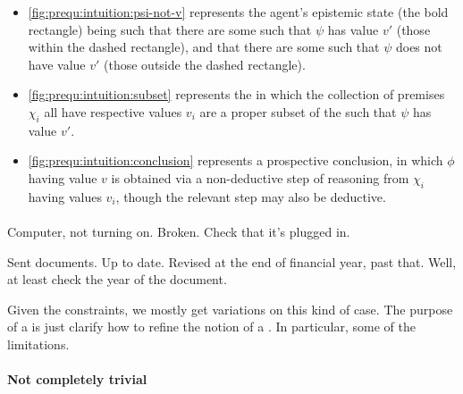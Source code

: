 \begin{note}
  \begin{itemize}
  \item
    \autoref{fig:prequ:intuition:psi-not-v} represents the agent's epistemic state (the bold rectangle) being such that there are some  such that \(\psi\) has value \(v'\) (those within the dashed rectangle), and that there are some  such that \(\psi\) does not have value \(v'\) (those outside the dashed rectangle).
  \item
    \autoref{fig:prequ:intuition:subset} represents the  in which the collection of premises \(\chi_{i}\) all have respective values \(v_{i}\) are a proper subset of the  such that \(\psi\) has value \(v'\).
  \item
    \autoref{fig:prequ:intuition:conclusion} represents a prospective conclusion, in which \(\phi\) having value \(v\) is obtained via a non-deductive step of reasoning from \(\chi_{i}\) having values \(v_{i}\), though the relevant step may also be deductive.
  \end{itemize}
\end{note}

\paragraph{}



\begin{note}
  \begin{illustration}
    Computer, not turning on.
    Broken.
    Check that it's plugged in.
  \end{illustration}
\end{note}

\begin{note}
  \begin{illustration}
    Sent documents.
    Up to date.
    Revised at the end of financial year, past that.
    Well, at least check the year of the document.
  \end{illustration}
\end{note}

\begin{note}
  Given the constraints, we mostly get variations on this kind of case.
  The purpose of a \prequ{} is just clarify how to refine the notion of a \requ{}.
  In particular, some of the limitations.
\end{note}

\paragraph{Not completely trivial}

